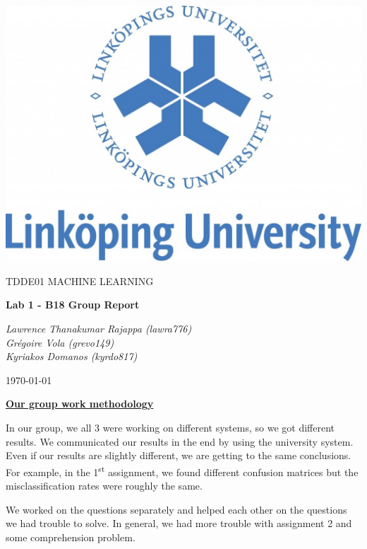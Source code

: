\documentclass[a4paper,10pt]{article}
\begin{document}
\begin{titlepage}
	\centering
	\includegraphics[width=.6\textwidth]{liu-logo.png}\par
	\vfill
	{\scshape\Large TDDE01 MACHINE LEARNING\par}
	{\huge\bfseries Lab 1 - B18 Group Report\par}
	\vspace{0.5cm}
    {\large\itshape Lawrence Thanakumar Rajappa (lawra776)\\
     \large\itshape Grégoire Vola (grevo149)\\
     \large\itshape Kyriakos Domanos (kyrdo817)\par}
	\vfill
	{\large \today\par}
\end{titlepage}

\textbf{\underline{Our group work methodology}} \par
In our group, we all 3 were working on different systems, so we got different results.
We communicated our results in the end by using the university system. Even if our results are slightly different, we are getting to the same conclusions.
For example, in the 1\textsuperscript{st} assignment, we found different confusion matrices but the misclassification rates were roughly the same.

We worked on the questions separately and helped each other on the questions we had trouble to solve. In general, we had more trouble with assignment 2 and some comprehension problem.
\end{document}
